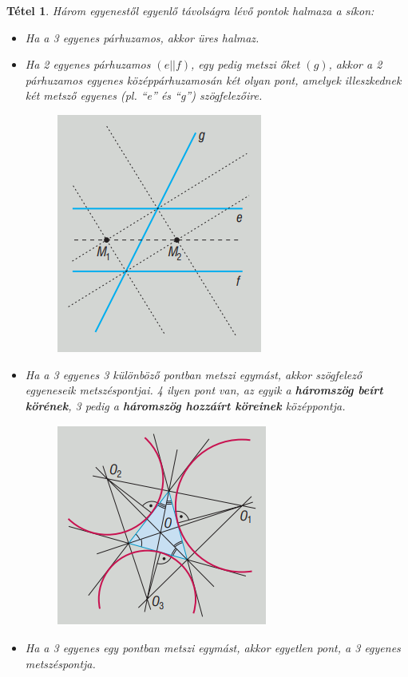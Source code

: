 \documentclass[12pt,a4paper]{article}
\newtheorem{theorem}{Tétel} [section]
\begin{document}
\begin{theorem}
Három egyenestől egyenlő távolságra lévő pontok halmaza a síkon:
\begin{itemize}
\item Ha a 3 egyenes párhuzamos, akkor üres halmaz.
\item Ha 2 egyenes párhuzamos $(e || f)$, egy pedig metszi őket $(g)$, akkor a 2 párhuzamos egyenes középpárhuzamosán két olyan pont, amelyek illeszkednek két metsző egyenes (pl. ``e'' és ``g'') szögfelezőire.
\begin{figure}[h]
\centering
\includegraphics[scale=0.4]{img/harom_egyenes_1}
\end{figure}
\item  Ha a 3 egyenes 3 különböző pontban metszi egymást, akkor szögfelező egyeneseik metszéspontjai. 4 ilyen pont van, az egyik a \textbf{háromszög beírt körének}, 3 pedig a \textbf{háromszög hozzáírt köreinek} középpontja.
\begin{figure}[h]
\centering
\includegraphics[scale=0.4]{img/harom_egyenes_2}
\end{figure}
\item  Ha a 3 egyenes egy pontban metszi egymást, akkor egyetlen pont, a 3 egyenes metszéspontja.

\end{itemize}
\end{theorem}
\end{document}
